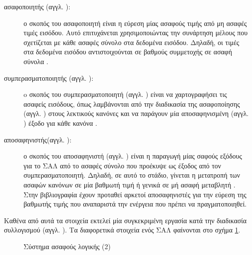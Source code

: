 \documentclass{assignment}
\begin{document}
\begin{description}
\item[ασαφοποιητής (αγγλ. ): ] ο σκοπός του ασαφοποιητή είναι η εύρεση μίας ασαφούς τιμής από μη ασαφές τιμές εισόδου. Αυτό επιτυχάνεται χρησιμοποιώντας την συνάρτηση μέλους που σχετίζεται με κάθε ασαφές σύνολο στα δεδομένα εισόδου. Δηλαδή, οι τιμές στα δεδομένα εισόδου αντιστοιχούνται σε βαθμούς συμμετοχής σε ασαφή σύνολα \cite{engelbrecht}.

\item [συμπερασματοποιητής (αγγλ. ): ] o σκοπός του συμπερασματοποιητή (αγγλ. ) είναι να χαρτογραφήσει τις ασαφείς εισόδους, όπως λαμβάνονται από την διαδικασία της ασαφοποίησης (αγγλ. ) στους λεκτικούς κανόνες και να παράγουν μία αποσαφηνισμένη (αγγλ. ) έξοδο για κάθε κανόνα \cite{engelbrecht}.

\item [αποσαφηνιστής(αγγλ. ): ] ο σκοπός του αποσαφηνιστή (αγγλ. ) είναι η παραγωγή μίας σαφούς εξόδους για το ΣΑΛ από το ασαφές σύνολο που προέκυψε ως έξοδος από τον συμπερασματοποιητή. Δηλαδή, σε αυτό το στάδιο, γίνεται η μετατροπή των ασαφών κανόνων σε μία βαθμωτή τιμή ή γενικά σε μή ασαφή μεταβλητή \cite{class_notes,engelbrecht}. Στην βιβλιογραφία έχουν προταθεί αρκετοί αποσαφηνιστές για την εύρεση της βαθμωτής τιμής που αναπαριστά την ενέργεια που πρέπει να πραγματοποιηθεί.
\end{description}

Καθένα από αυτά τα στοιχεία εκτελεί μία συγκεκριμένη εργασία κατά την διαδικασία συλλογισμού (αγγλ. ). Τα διαφορετικά στοιχεία ενός ΣΑΛ φαίνονται στο σχήμα \ref{fig:fuzzy_logic_system_2}.

\begin{figure}
\begin{center}
\caption{Σύστημα ασαφούς λογικής (2) \cite{engelbrecht}}
\label{fig:fuzzy_logic_system_2}
\end{center}
\end{figure}
\end{document}
